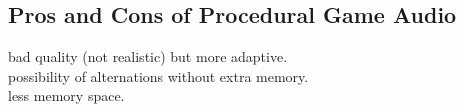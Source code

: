 \subsection{Pros and Cons of Procedural Game Audio}
bad quality (not realistic) but more adaptive.\\
possibility of alternations without extra memory.\\
less memory space.\\